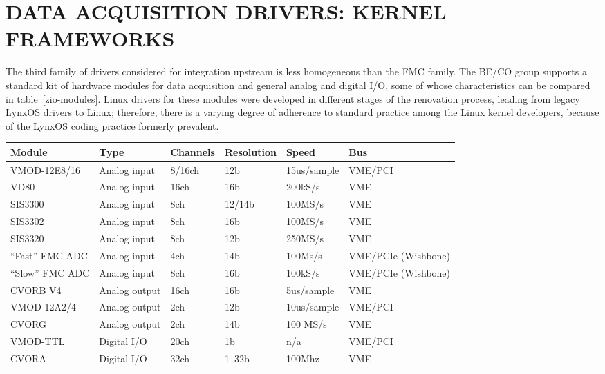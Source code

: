 \documentclass{JAC2003}
\begin{document}
\section{DATA ACQUISITION DRIVERS: KERNEL FRAMEWORKS}

The third family of drivers considered for integration upstream is less
homogeneous than the FMC family. The BE/CO group supports a standard kit
of hardware modules for data acquisition and general analog and digital I/O,
some of whose characteristics can be compared in table~\ref{zio-modules}. Linux
drivers for these modules were developed in different stages of the renovation
process, leading from legacy LynxOS drivers to Linux; therefore, there is a
varying degree of adherence to standard practice among the Linux kernel
developers,
because of the LynxOS coding practice formerly prevalent.

\begin{table*}[ht]
   \centering
   \caption{BE/CO data acquisition modules}
   \begin{tabular}{llllll}
       \toprule
	\textbf{Module}& \textbf{Type}& \textbf{Channels}&
	\textbf{Resolution}& \textbf{Speed}& \textbf{Bus} \\
       \midrule
	VMOD-12E8/16    &  Analog input  & 8/16ch & 12b    & 15us/sample & VME/PCI  \\
	VD80            &  Analog input  & 16ch   & 16b    & 200kS/s     & VME  \\
	SIS3300         &  Analog input  & 8ch    & 12/14b & 100MS/s     & VME  \\
	SIS3302         &  Analog input  & 8ch    & 16b    & 100MS/s     & VME  \\
	SIS3320         &  Analog input  & 8ch    & 12b    & 250MS/s     & VME  \\
	``Fast'' FMC ADC&  Analog input  & 4ch    & 14b    & 100Ms/s     & VME/PCIe (Wishbone)  \\
	``Slow'' FMC ADC&  Analog input  & 8ch    & 16b    & 100kS/s     & VME/PCIe (Wishbone)  \\
       \midrule
	CVORB V4        &  Analog output & 16ch   &  16b   &  5us/sample & VME 	 \\
	VMOD-12A2/4     &  Analog output & 2ch    &  12b   &  10us/sample& VME/PCI \\
	CVORG           &  Analog output & 2ch    &  14b   &  100 MS/s   & VME  \\
       \midrule
	VMOD-TTL        &  Digital I/O   & 20ch   & 1b     & n/a         & VME/PCI \\
	CVORA           &  Digital I/O   & 32ch   & 1--32b & 100Mhz	 & VME \\
       \bottomrule
   \end{tabular}
   \label{zio-modules}
\end{table*}
\end{document}
